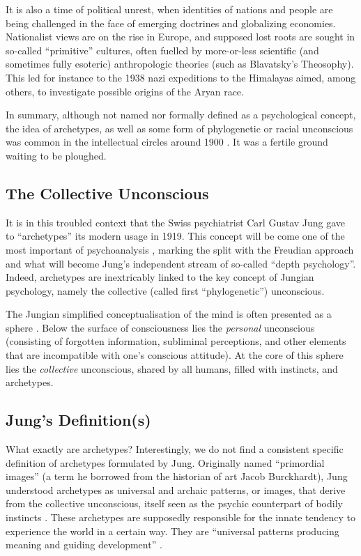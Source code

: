 \documentclass[
]{book}
\begin{document}
It is also a time of political unrest, when identities of nations and people are being challenged in the face of emerging doctrines and globalizing economies. Nationalist views are on the rise in Europe, and supposed lost roots are sought in so-called ``primitive'' cultures, often fuelled by more-or-less scientific (and sometimes fully esoteric) anthropologic theories (such as Blavatsky's Theosophy). This led for instance to the 1938 nazi expeditions to the Himalayas aimed, among others, to investigate possible origins of the Aryan race.

In summary, although not named nor formally defined as a psychological concept, the idea of archetypes, as well as some form of phylogenetic or racial unconscious was common in the intellectual circles around 1900 \citep{shamdasani2003cult}. It was a fertile ground waiting to be ploughed.

\hypertarget{the-collective-unconscious}{%
\subsection{The Collective Unconscious}\label{the-collective-unconscious}}

It is in this troubled context that the Swiss psychiatrist Carl Gustav Jung gave to ``archetypes'' its modern usage in 1919. This concept will be come one of the most important of psychoanalysis \citep{roesler2012archetypes}, marking the split with the Freudian approach and what will become Jung's independent stream of so-called ``depth psychology''. Indeed, archetypes are inextricably linked to the key concept of Jungian psychology, namely the collective (called first ``phylogenetic'') unconscious.

The Jungian simplified conceptualisation of the mind is often presented as a sphere \citep{cann1986jungian}. Below the surface of consciousness lies the \emph{personal} unconscious (consisting of forgotten information, subliminal perceptions, and other elements that are incompatible with one's conscious attitude). At the core of this sphere lies the \emph{collective} unconscious, shared by all humans, filled with instincts, and archetypes.

\hypertarget{jungs-definitions}{%
\subsection{Jung's Definition(s)}\label{jungs-definitions}}

What exactly are archetypes? Interestingly, we do not find a consistent specific definition of archetypes formulated by Jung. Originally named ``primordial images'' (a term he borrowed from the historian of art Jacob Burckhardt), Jung understood archetypes as universal and archaic patterns, or images, that derive from the collective unconscious, itself seen as the psychic counterpart of bodily instincts \citep{feist2009theories}. These archetypes are supposedly responsible for the innate tendency to experience the world in a certain way. They are ``universal patterns producing meaning and guiding development'' \citep{roesler2012archetypes}.
\end{document}
